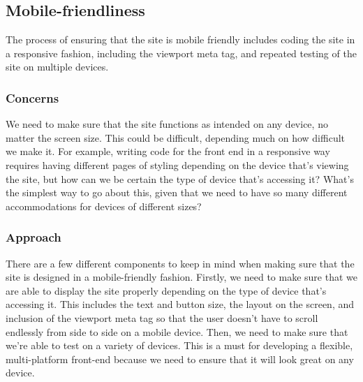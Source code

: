 \documentclass[onecolumn, draftclsnofoot,10pt, compsoc]{IEEEtran}
\begin{document}
\subsection{Mobile-friendliness}
The process of ensuring that the site is mobile friendly includes coding the site in a responsive fashion, including the viewport meta tag, and repeated testing of the site on multiple devices.
\subsubsection{Concerns}
We need to make sure that the site functions as intended on any device, no matter the screen size. This could be difficult, depending much on how difficult we make it. For example, writing code for the front end in a responsive way requires having different pages of styling depending on the device that's viewing the site, but how can we be certain the type of device that's accessing it? What's the simplest way to go about this, given that we need to have so many different accommodations for devices of different sizes?
\subsubsection{Approach}
There are a few different components to keep in mind when making sure that the site is designed in a mobile-friendly fashion. Firstly, we need to make sure that we are able to display the site properly depending on the type of device that's accessing it. This includes the text and button size, the layout on the screen, and inclusion of the viewport meta tag so that the user doesn't have to scroll endlessly from side to side on a mobile device. Then, we need to make sure that we're able to test on a variety of devices. This is a must for developing a flexible, multi-platform front-end because we need to ensure that it will look great on any device.
\end{document}
